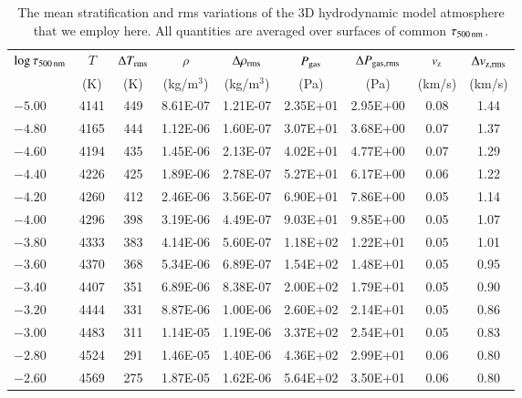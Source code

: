 \documentclass[traditabstract]{aa}
\begin{document}
\begin{table}[htbp]
\centering
\caption{The mean stratification and rms variations of the 3D hydrodynamic model atmosphere that we employ here. All quantities are averaged over surfaces of common $\tau_{500\,{\rm nm}}$.}
\label{table:3Dmodel}
\begin{tabular}{l c c c c c c c c}
\hline
\hline
$\log\tau_{500\,{\rm nm}}$ & $T$ & $\Delta T_{\rm rms}$ & $\rho$ & $\Delta \rho_{\rm rms}$ &
$P_{\rm gas}$ & $\Delta P_{\rm gas, rms}$ &
$v_{\rm z}$ & $\Delta v_{\rm z,rms}$ \\
& (K) & (K) & (kg/m$^3$) & (kg/m$^3$) & (Pa)   & (Pa)  & (km/s) & (km/s) \\
\hline
 $-5.00$ &    4141 &    449 &   8.61E-07 &   1.21E-07 &   2.35E+01 &   2.95E+00  &     0.08 &     1.44 \\
 $-4.80$ &    4165 &    444 &   1.12E-06 &   1.60E-07 &   3.07E+01 &   3.68E+00  &     0.07 &     1.37 \\
 $-4.60$ &    4194 &    435 &   1.45E-06 &   2.13E-07 &   4.02E+01 &   4.77E+00  &     0.07 &     1.29 \\
 $-4.40$ &    4226 &    425 &   1.89E-06 &   2.78E-07 &   5.27E+01 &   6.17E+00  &     0.06 &     1.22 \\
 $-4.20$ &    4260 &    412 &   2.46E-06 &   3.56E-07 &   6.90E+01 &   7.86E+00  &     0.05 &     1.14 \\
 $-4.00$ &    4296 &    398 &   3.19E-06 &   4.49E-07 &   9.03E+01 &   9.85E+00  &     0.05 &     1.07 \\
 $-3.80$ &    4333 &    383 &   4.14E-06 &   5.60E-07 &   1.18E+02 &   1.22E+01  &     0.05 &     1.01 \\
 $-3.60$ &    4370 &    368 &   5.34E-06 &   6.89E-07 &   1.54E+02 &   1.48E+01  &     0.05 &     0.95 \\
 $-3.40$ &    4407 &    351 &   6.89E-06 &   8.38E-07 &   2.00E+02 &   1.79E+01  &     0.05 &     0.90 \\
 $-3.20$ &    4444 &    331 &   8.87E-06 &   1.00E-06 &   2.60E+02 &   2.14E+01  &     0.05 &     0.86 \\
 $-3.00$ &    4483 &    311 &   1.14E-05 &   1.19E-06 &   3.37E+02 &   2.54E+01  &     0.05 &     0.83 \\
 $-2.80$ &    4524 &    291 &   1.46E-05 &   1.40E-06 &   4.36E+02 &   2.99E+01  &     0.06 &     0.80 \\
 $-2.60$ &    4569 &    275 &   1.87E-05 &   1.62E-06 &   5.64E+02 &   3.50E+01  &     0.06 &     0.80 \\

\end{tabular}
\end{table}
\end{document}
